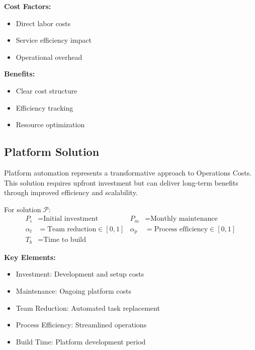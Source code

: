 \documentclass[12pt,a4paper]{article}
\newenvironment{definition}[1]
{\begin{mdframed}[style=definitionstyle,frametitle={Definition: #1}]}
{\end{mdframed}}
\newenvironment{explanation}
{\begin{mdframed}[style=explanationstyle,frametitle={Explanation}]}
{\end{mdframed}}
\begin{document}
\begin{explanation}
\textbf{Cost Factors:}
\begin{itemize}
    \item Direct labor costs
    \item Service efficiency impact
    \item Operational overhead
\end{itemize}
\textbf{Benefits:}
\begin{itemize}
    \item Clear cost structure
    \item Efficiency tracking
    \item Resource optimization
\end{itemize}
\end{explanation}

\subsection{Platform Solution}
Platform automation represents a transformative approach to Operations Costs. This solution requires upfront investment but can deliver long-term benefits through improved efficiency and scalability.

\begin{definition}{Platform Variables}
For solution $\mathcal{P}$:
\begin{align*}
    P_i &= \text{Initial investment} & P_m &= \text{Monthly maintenance} \\
    \alpha_t &= \text{Team reduction} \in [0,1] & \alpha_p &= \text{Process efficiency} \in [0,1] \\
    T_b &= \text{Time to build} & &
\end{align*}
\end{definition}

\begin{explanation}
\textbf{Key Elements:}
\begin{itemize}
    \item Investment: Development and setup costs
    \item Maintenance: Ongoing platform costs
    \item Team Reduction: Automated task replacement
    \item Process Efficiency: Streamlined operations
    \item Build Time: Platform development period
\end{itemize}
\end{explanation}
\end{document}
